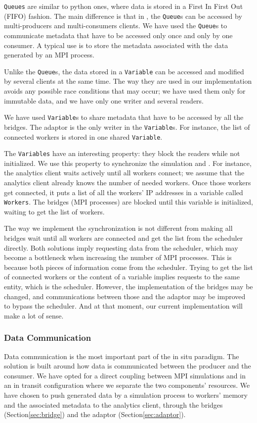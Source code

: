 \dask \texttt{Queues} are similar to python ones, where data is stored in a First In First Out (FIFO) fashion. The main difference is that in \dask, the \texttt{Queue}s can be accessed by multi-producers and multi-consumers \dask clients. 
We have used the \texttt{Queue}s to communicate metadata that have to be accessed only once and only by one consumer. A typical use is to store the metadata associated with the data generated by an MPI process.  

Unlike the \texttt{Queue}s, the data stored in a \dask \texttt{Variable} can be accessed and modified by several clients at the same time. 
The way they are used in our implementation avoids any possible race conditions that may occur; we have used them only for immutable data, and we have only one writer and several readers.

We have used \texttt{Variable}s to share metadata that have to be accessed by all the bridges. The adaptor is the only writer in the \texttt{Variable}s. For instance, the list of connected workers is stored in one shared \texttt{Variable}.  

The \texttt{Variables} have an interesting property: they block the readers while  not initialized. 
We use this property to synchronize the simulation and \dask.  
For instance, the analytics client waits actively until all workers connect; we assume that the analytics client already knows the number of needed workers. Once those workers get connected, it puts a list of all the workers' IP addresses in a variable called \texttt{Workers}. The bridges (MPI processes) are blocked until this variable is initialized, waiting to get the list of workers.

The way we implement the synchronization is not different from making all bridges wait until all workers are connected and get the list from the scheduler directly. Both solutions imply requesting data from the scheduler, which may become a bottleneck when increasing the number of MPI processes. 
This is because both pieces of information come from the scheduler. Trying to get the list of connected workers or the content of a variable implies requests to the same entity, which is the scheduler. However, the implementation of the bridges may be changed, and communications between those and the adaptor may be improved to bypass the scheduler. And at that moment, our current implementation will make a lot of sense.    

\subsubsection{Data Communication}\label{sec:DandCcomm:data}
Data communication is the most important part of the in situ paradigm. The solution is built around how data is communicated between the producer and the consumer. 
We have opted for a direct coupling between MPI simulations and \dask in an in transit configuration where we separate the two components' resources. 
We have chosen to push generated data by a simulation process to \dask workers' memory and the associated metadata to the analytics client, through the bridges (Section\ref{sec:bridge}) and the adaptor (Section\ref{sec:adaptor}).

